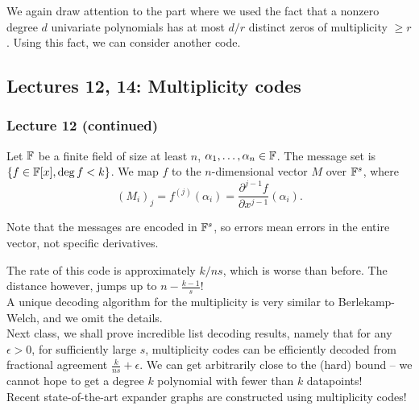 		We again draw attention to the part where we used the fact that a nonzero degree $d$ univariate polynomials has at most $d/r$ distinct zeros of multiplicity $\ge r$.
		Using this fact, we can consider another code.

\subsection{Lectures 12, 14: Multiplicity codes}

	\subsubsection{Lecture 12 (continued)}

		\begin{fdef}
			Let $\mathbb{F}$ be a finite field of size at least $n$, $\alpha_1,\ldots,\alpha_n \in \mathbb{F}$. The message set is $\{f \in \mathbb{F}[x], \deg f < k\}$. We map $f$ to the $n$-dimensional vector $M$ over $\mathbb{F}^s$, where
			\[ (M_{i})_j = f^{(j)}(\alpha_i) = \frac{\partial^{j-1} f}{\partial x^{j-1}}(\alpha_i). \]
		\end{fdef}
		Note that the messages are encoded in $\mathbb{F}^s$, so errors mean errors in the entire vector, not specific derivatives.

		The rate of this code is approximately $k/ns$, which is worse than before. The distance however, jumps up to $n - \frac{k-1}{s}$!\\
		A unique decoding algorithm for the multiplicity is very similar to Berlekamp-Welch, and we omit the details.\\
		Next class, we shall prove incredible list decoding results, namely that for any $\epsilon > 0$, for sufficiently large $s$, multiplicity codes can be efficiently decoded from fractional agreement $\frac{k}{ns} + \epsilon$. We can get arbitrarily close to the (hard) bound -- we cannot hope to get a degree $k$ polynomial with fewer than $k$ datapoints!\\ %
		Recent state-of-the-art expander graphs are constructed using multiplicity codes! %
	
